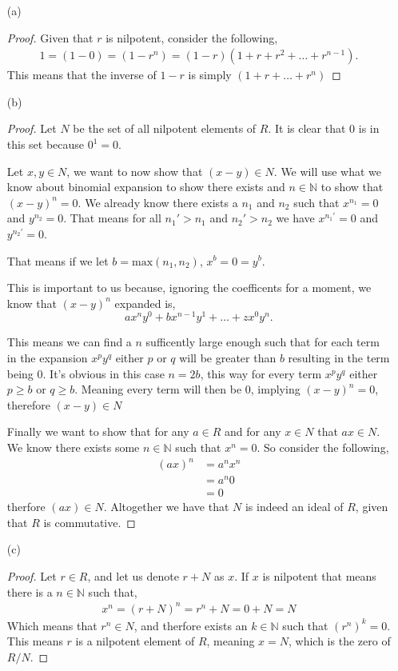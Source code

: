 \documentclass[11pt]{article}
\newcommand{\nn}{\mathbb N}   %
\renewcommand{\geq}{\geqslant}
\begin{document}
\begin{itemize}
    \item[(a)]
    \begin{proof}
        Given that $r$ is nilpotent, consider the following,
        \begin{align*}
            1 = (1 - 0) = (1 - r^{n}) = (1-r)(1 + r + r^{2} + \dots + r^{n-1}).
        \end{align*}
        This means that the inverse of $1-r$ is simply $(1 + r + \dots + r^{n})$
    \end{proof} 
    \item[(b)]
    \begin{proof}
        Let $N$ be the set of all nilpotent elements of $R$. It is clear that $0$ is in this set because $0^{1} = 0$. 

        Let $x,y \in N$, we want to now show that $(x-y) \in N$. We will use what we know about binomial expansion to show there exists and $n \in \nn$ to show that $(x-y)^{n} = 0$. We already know there exists a $n_1$ and $n_2$ such that $x^{n_1} = 0$ and $y^{n_2} = 0$. That means for all $n_1' > n_1$ and $n_2' > n_2$ we have $x^{n_1'} = 0$ and $y^{n_2'} = 0$. 

        That means if we let $b = \text{max}(n_1, n_2)$, $x^{b} = 0 = y^{b}$.

        This is important to us because, ignoring the coefficents for a moment, we know that $(x-y)^{n}$ expanded is,
        \[ax^{n}y^{0} + bx^{n-1}y^{1} + \dots + zx^{0}y^{n}.\]
        
        This means we can find a $n$ sufficently large enough such that for each term in the expansion $x^{p}y^{q}$ either $p$ or $q$ will be greater than $b$ resulting in the term being 0. It's obvious in this case $n = 2b$, this way for every term $x^{p}y^{q}$ either $p \geq b$ or $q \geq b$. Meaning every term will then be 0, implying $(x -y)^{n} = 0$, therefore $(x-y) \in N$

        Finally we want to show that for any $a \in R$ and for any $x \in N$ that $ax \in N$. We know there exists some $n \in \nn$ such that $x^{n} = 0$. So consider the following,
        \begin{align*}
            (ax)^{n} &= a^{n}x^{n} \\
            &=a^{n}0 \\
            &= 0
        \end{align*}
        therfore $(ax) \in N$. Altogether we have that $N$ is indeed an ideal of $R$, given that $R$ is commutative.
    \end{proof}
    \item[(c)]
    \begin{proof}
        Let $r\in R$, and let us denote $r + N$ as $x$. If $x$ is nilpotent that means there is a $n \in \nn$ such that,
        \begin{align*}
            x^{n} = (r + N)^{n} = r^{n} + N = 0 + N = N
        \end{align*}
        Which means that $r^{n} \in N$, and therfore exists an $k \in \nn$ such that $(r^{n})^{k} = 0$. This means $r$ is a nilpotent element of $R$, meaning $x = N$, which is the zero of $R/N$.
    \end{proof} 
\end{itemize}
\end{document}

